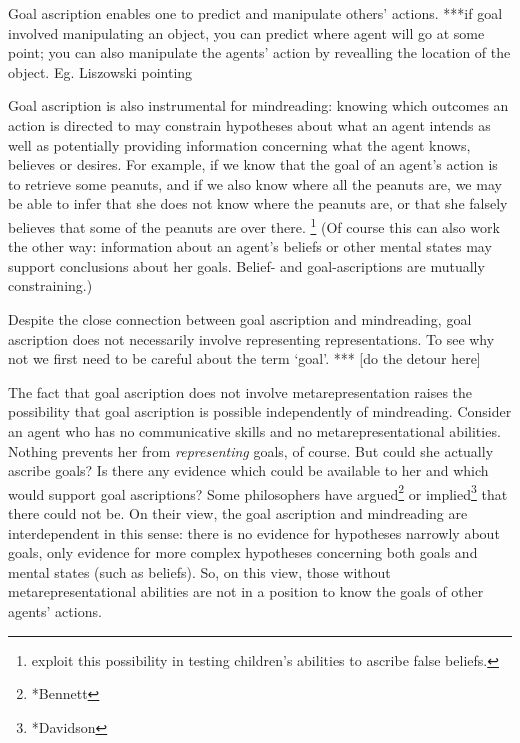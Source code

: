 \documentclass[12pt,a4paper]{extarticle}
\begin{document}
Goal ascription enables one
to predict and manipulate others' actions.
***if goal involved manipulating an object, you can predict where agent will go at some point; you can also manipulate the agents' action by revealling the location of the object.  Eg. Liszowski pointing


Goal ascription is also instrumental for mindreading:
knowing which outcomes an action is directed to may constrain hypotheses about what an agent intends 
as well as
potentially providing information concerning what the agent knows, believes or desires.
For example,
if we know that the goal of an agent's action is to retrieve some peanuts,
and if we also know where all the peanuts are,
we may be able to infer that she does not know where the peanuts are,
or that she falsely believes that some of the peanuts are over there.%
\footnote{
\citet{Wimmer:1998kx} exploit this possibility in testing children's abilities to ascribe false beliefs.
}
(Of course this can also work the other way:
information about an agent's beliefs or other mental states may support conclusions about her goals.
Belief- and goal-ascriptions are mutually constraining.)


Despite the close connection between goal ascription and mindreading,
goal ascription does not necessarily involve representing representations.
To see why not we first need to be careful about the term `goal'.
***
[do the detour here]

The fact that goal ascription does not involve metarepresentation raises the possibility that goal ascription is possible independently of mindreading.
Consider an agent who has no communicative skills and no metarepresentational abilities.
Nothing prevents her from \emph{representing} goals, of course.
But could she actually ascribe goals?
Is there any evidence which could be available to her and which would support goal ascriptions?
Some philosophers have argued\footnote{*Bennett} or implied\footnote{*Davidson} that there could not be.
On their view, the goal ascription and mindreading are interdependent in this sense: 
there is no evidence for hypotheses narrowly about goals, only evidence for more complex hypotheses concerning both goals and mental states (such as beliefs).
So, on this view, those without metarepresentational abilities are not in a position to know the goals of other agents' actions.
\end{document}

